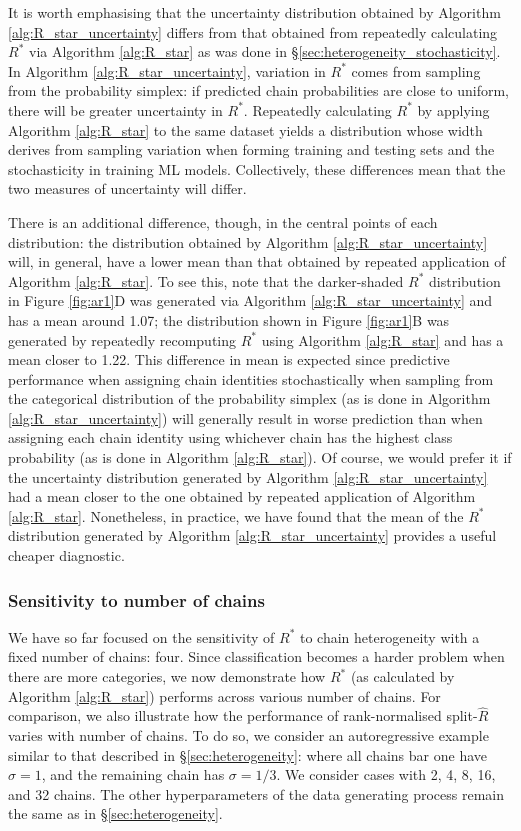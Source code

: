 \documentclass{article}
\begin{document}
It is worth emphasising that the uncertainty distribution obtained by Algorithm \ref{alg:R_star_uncertainty} differs from that obtained from repeatedly calculating $R^*$ via Algorithm \ref{alg:R_star} as was done in \S\ref{sec:heterogeneity_stochasticity}. In Algorithm \ref{alg:R_star_uncertainty}, variation in $R^*$ comes from sampling from the probability simplex: if predicted chain probabilities are close to uniform, there will be greater uncertainty in $R^*$. Repeatedly calculating $R^*$ by applying Algorithm \ref{alg:R_star} to the same dataset yields a distribution whose width derives from sampling variation when forming training and testing sets and the stochasticity in training ML models. Collectively, these differences mean that the two measures of uncertainty will differ.

There is an additional difference, though, in the central points of each distribution: the distribution obtained by Algorithm \ref{alg:R_star_uncertainty} will, in general, have a lower mean than that obtained by repeated application of Algorithm \ref{alg:R_star}. To see this, note that the darker-shaded $R^*$ distribution in Figure \ref{fig:ar1}D was generated via Algorithm \ref{alg:R_star_uncertainty} and has a mean around 1.07; the distribution shown in Figure \ref{fig:ar1}B was generated by repeatedly recomputing $R^*$ using Algorithm \ref{alg:R_star} and has a mean closer to 1.22. This difference in mean is expected since predictive performance when assigning chain identities stochastically when sampling from the categorical distribution of the probability simplex (as is done in Algorithm \ref{alg:R_star_uncertainty}) will generally result in worse prediction than when assigning each chain identity using whichever chain has the highest class probability (as is done in Algorithm \ref{alg:R_star}). Of course, we would prefer it if the uncertainty distribution generated by Algorithm \ref{alg:R_star_uncertainty} had a mean closer to the one obtained by repeated application of Algorithm \ref{alg:R_star}. Nonetheless, in practice, we have found that the mean of the $R^*$ distribution generated by Algorithm \ref{alg:R_star_uncertainty} provides a useful cheaper diagnostic.

\subsubsection{Sensitivity to number of chains}\label{sec:heterogeneity_numchains}
We have so far focused on the sensitivity of $R^*$ to chain heterogeneity with a fixed number of chains: four. Since classification becomes a harder problem when there are more categories, we now demonstrate how $R^*$ (as calculated by Algorithm \ref{alg:R_star}) performs across various number of chains. For comparison, we also illustrate how the performance of rank-normalised split-$\widehat{R}$ varies with number of chains. To do so, we consider an autoregressive example similar to that described in \S\ref{sec:heterogeneity}: where all chains bar one have $\sigma=1$, and the remaining chain has $\sigma=1/3$. We consider cases with 2, 4, 8, 16, and 32 chains. The other hyperparameters of the data generating process remain the same as in \S\ref{sec:heterogeneity}.
\end{document}
